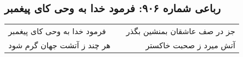 \begin{center}
\section*{رباعی شماره ۹۰۶: فرمود خدا به وحی کای پیغمبر}
\label{sec:0906}
\begin{longtable}{l p{0.5cm} r}
فرمود خدا به وحی کای پیغمبر
&&
جز در صف عاشقان بمنشین بگذر
\\
هر چند ز آتشت جهان گرم شود
&&
آتش میرد ز صحبت خاکستر
\\
\end{longtable}
\end{center}
